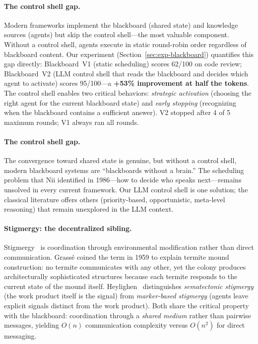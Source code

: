 \documentclass{article}
\begin{document}
\paragraph{The control shell gap.}
Modern frameworks implement the blackboard (shared state) and knowledge sources (agents)
but skip the control shell---the most valuable component. Without a control shell, agents
execute in static round-robin order regardless of blackboard content. Our experiment
(Section~\ref{sec:exp-blackboard}) quantifies this gap directly: Blackboard~V1 (static
scheduling) scores 62/100 on code review; Blackboard~V2 (LLM control shell that reads
the blackboard and decides which agent to activate) scores 95/100---a
\textbf{+53\% improvement at half the tokens}. The control shell enables two critical
behaviors: \emph{strategic activation} (choosing the right agent for the current
blackboard state) and \emph{early stopping} (recognizing when the blackboard contains
a sufficient answer). V2 stopped after 4 of 5 maximum rounds; V1 always ran all
rounds.

\paragraph{The control shell gap.}
The convergence toward shared state is genuine, but without a control shell, modern
blackboard systems are ``blackboards without a brain.'' The scheduling problem that
Nii identified in 1986---how to decide who speaks next---remains unsolved in every
current framework. Our LLM control shell is one solution; the classical literature
offers others (priority-based, opportunistic, meta-level reasoning) that remain
unexplored in the LLM context.

\paragraph{Stigmergy: the decentralized sibling.}
Stigmergy~\citep{grasse1959reconstruction} is coordination through environmental
modification rather than direct communication. Grass\'{e} coined the term in
1959 to explain termite mound construction: no termite communicates with any other, yet
the colony produces architecturally sophisticated structures because each termite responds
to the current state of the mound itself.
Heylighen~\citep{heylighen2016stigmergy} distinguishes \emph{sematectonic stigmergy}
(the work product itself is the signal) from \emph{marker-based stigmergy}
(agents leave explicit signals distinct from the work product).
Both share the critical property with the blackboard: coordination through a
\emph{shared medium} rather than pairwise messages, yielding $O(n)$ communication
complexity versus $O(n^2)$ for direct messaging.
\end{document}
